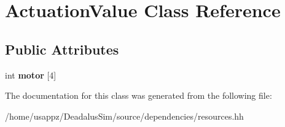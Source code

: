 \hypertarget{classActuationValue}{\section{\-Actuation\-Value \-Class \-Reference}
\label{classActuationValue}
}
\subsection*{\-Public \-Attributes}
\begin{DoxyCompactItemize}
\item 
\hypertarget{classActuationValue_ae06e29bc9354cb8f1dd606100c589490}{int {\bfseries motor} \mbox{[}4\mbox{]}}\label{classActuationValue_ae06e29bc9354cb8f1dd606100c589490}

\end{DoxyCompactItemize}


\-The documentation for this class was generated from the following file\-:\begin{DoxyCompactItemize}
\item 
/home/usappz/\-Deadalus\-Sim/source/dependencies/resources.\-hh\end{DoxyCompactItemize}
